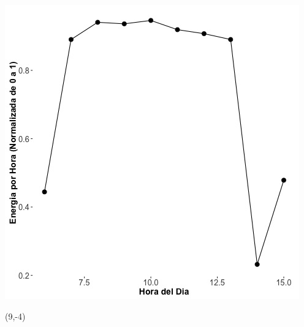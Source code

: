\documentclass{article}\usepackage[]{graphicx}\usepackage[]{color}
\newenvironment{knitrout}{}{} %
\begin{document}
\begin{knitrout}
\color{fgcolor}
\includegraphics[scale=0.75]{figure/A6_fplot_norm_median} 
\end{knitrout}

 \begin{textblock}{1}(9,-4)
\begin{minipage}{20em}
\begingroup

\endgroup
\end{minipage}
\end{textblock}





\end{document}
